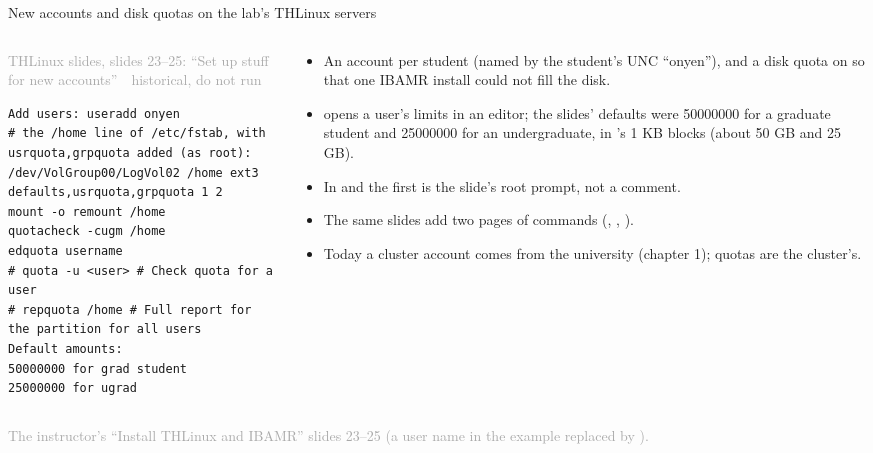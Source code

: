 \documentclass[aspectratio=169,11pt]{beamer}
\newcommand{\sourcecredit}[1]{\vfill\begin{flushright}\tiny\textcolor{DarkGray}{#1}\end{flushright}}
\newcommand{\hist}[1]{{\tiny\sffamily\textcolor{DarkGray}{#1\ \textbullet\ historical, do not run}}\par\nointerlineskip\vspace{0.3mm}}
\begin{document}
\begin{frame}[fragile]{New accounts and disk quotas on the lab's THLinux servers}
\label{fr:quotas}
\begin{columns}[T,onlytextwidth]
\begin{column}{0.55\textwidth}
\hist{THLinux slides, slides 23--25: ``Set up stuff for new accounts''}
\begin{lstlisting}[style=hist]
Add users: useradd onyen
# the /home line of /etc/fstab, with usrquota,grpquota added (as root):
/dev/VolGroup00/LogVol02 /home ext3 defaults,usrquota,grpquota 1 2
mount -o remount /home
quotacheck -cugm /home
edquota username
# quota -u <user> # Check quota for a user
# repquota /home # Full report for the partition for all users
Default amounts:
50000000 for grad student
25000000 for ugrad
\end{lstlisting}
\end{column}
\begin{column}{0.42\textwidth}
\scriptsize
\begin{itemize}\setlength{\itemsep}{2pt}
  \item An account per student (named by the student's UNC ``onyen''), and a disk quota on  so that one IBAMR install could not fill the disk.
  \item {} opens a user's limits in an editor; the slides' defaults were 50000000 for a graduate student and 25000000 for an undergraduate, in 's 1 KB blocks (about 50 GB and 25 GB).
  \item In  and  the first \code{\#} is the slide's root prompt, not a comment.
  \item The same slides add two pages of  commands (, , ).
  \item Today a cluster account comes from the university (chapter 1); quotas are the cluster's.
\end{itemize}
\end{column}
\end{columns}
\sourcecredit{The instructor's ``Install THLinux and IBAMR'' slides 23--25 (a user name in the \code{quota} example replaced by \code{<user>}).}
\end{frame}
\end{document}
